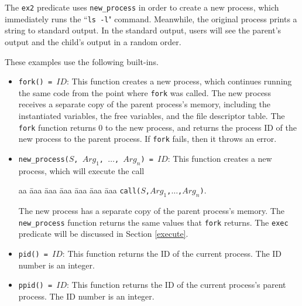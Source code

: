 The \texttt{ex2} predicate uses \texttt{new\_process} in order to create a new process, which immediately runs the ``\texttt{ls -l}" command.  Meanwhile, the original process prints a string to standard output.  In the standard output, users will see the parent's output and the child's output in a random order.

These examples use the following built-ins. 
\begin{itemize}
\item \texttt{fork() = $ID$}: This function creates a new process, which continues running the same code from the point where \texttt{fork} was called.  The new process receives a separate copy of the parent process's memory, including the instantiated variables, the free variables, and the file descriptor table.  The \texttt{fork} function returns $0$ to the new process, and returns the process ID of the new process to the parent process.  If \texttt{fork} fails, then it throws an error.
\item \texttt{new\_process($S$, $Arg_1$, $\ldots$, $Arg_n$) = $ID$}: This function creates a new process, which will execute the call 
\begin{tabbing}
aa \= aaa \= aaa \= aaa \= aaa \= aaa \= aaa \kill
\> \texttt{call($S$,$Arg_1$,$\ldots$,$Arg_n$)}.  
\end{tabbing}
The new process has a separate copy of the parent process's memory. The \texttt{new\_process} function returns the same values that \texttt{fork} returns.  The \texttt{exec} predicate will be discussed in Section \ref{execute}.
\item \texttt{pid() = $ID$}: This function returns the ID of the current process.  The ID number is an integer.
\item \texttt{ppid() = $ID$}: This function returns the ID of the current process's parent process.  The ID number is an integer.
\end{itemize}

